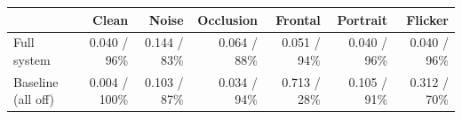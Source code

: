 \begin{tabular}{lrrrrrr}
\toprule
 & Clean & Noise & Occlusion & Frontal & Portrait & Flicker\\
\midrule
Full system & 0.040 / 96\% & 0.144 / 83\% & 0.064 / 88\% & 0.051 / 94\% & 0.040 / 96\% & 0.040 / 96\%\\
Baseline (all off) & 0.004 / 100\% & 0.103 / 87\% & 0.034 / 94\% & 0.713 / 28\% & 0.105 / 91\% & 0.312 / 70\%\\
\bottomrule
\end{tabular}

